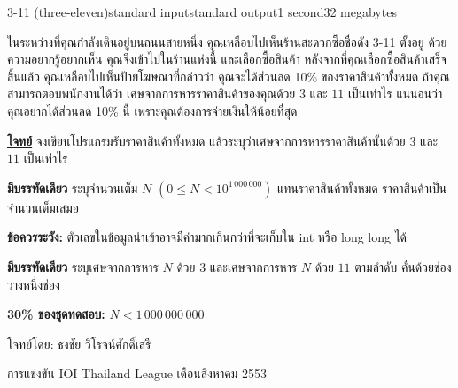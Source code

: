 \documentclass[11pt,a4paper]{article}
\begin{document}
\begin{problem}{3-11 (three-eleven)}{standard input}{standard output}{1 second}{32 megabytes}

ในระหว่างที่คุณกำลังเดินอยู่บนถนนสายหนึ่ง คุณเหลือบไปเห็นร้านสะดวกซื้อชื่อดัง 3-11 ตั้งอยู่ ด้วยความอยากรู้อยากเห็น คุณจึงเข้าไปในร้านแห่งนี้ และเลือกซื้อสินค้า หลังจากที่คุณเลือกซื้อสินค้าเสร็จสิ้นแล้ว คุณเหลือบไปเห็นป้ายโฆษณาที่กล่าวว่า คุณจะได้ส่วนลด 10\% ของราคาสินค้าทั้งหมด ถ้าคุณสามารถตอบพนักงานได้ว่า เศษจากการหารราคาสินค้าของคุณด้วย $3$ และ $11$ เป็นเท่าไร แน่นอนว่าคุณอยากได้ส่วนลด 10\% นี้ เพราะคุณต้องการจ่ายเงินให้น้อยที่สุด

\underline{\textbf{โจทย์}} จงเขียนโปรแกรมรับราคาสินค้าทั้งหมด แล้วระบุว่าเศษจากการหารราคาสินค้านั้นด้วย $3$ และ $11$ เป็นเท่าไร

\InputFile

\textbf{มีบรรทัดเดียว}  ระบุจำนวนเต็ม $N$ $(0 \leq N  <  10^{1\,000\,000})$ แทนราคาสินค้าทั้งหมด ราคาสินค้าเป็นจำนวนเต็มเสมอ

\textbf{ข้อควรระวัง:} ตัวเลขในข้อมูลนำเข้าอาจมีค่ามากเกินกว่าที่จะเก็บใน int หรือ long long ได้

\OutputFile

\textbf{มีบรรทัดเดียว} ระบุเศษจากการหาร $N$ ด้วย $3$ และเศษจากการหาร $N$ ด้วย $11$ ตามลำดับ คั่นด้วยช่องว่างหนึ่งช่อง

\Examples

\begin{example}
%
%
\end{example}


\Scoring 

\textbf{30\% ของชุดทดสอบ:} $N < 1\,000\,000\,000$

\Source

โจทย์โดย: ธงชัย วิโรจน์ศักดิ์เสรี

การแข่งขัน IOI Thailand League เดือนสิงหาคม 2553

\end{problem}
\end{document}
